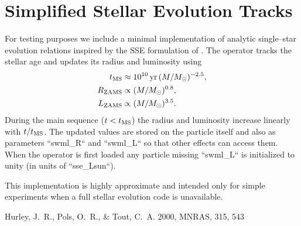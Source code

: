\section{Simplified Stellar Evolution Tracks}
\label{sec:sse_tracks}

For testing purposes we include a minimal implementation of analytic
single--star evolution relations inspired by the SSE formulation of
\citet{Hurley2000}.  The operator tracks the stellar age and updates
its radius and luminosity using
\begin{align}
  t_{\rm MS} &\approx 10^{10}\,\mathrm{yr}\,(M/M_\odot)^{-2.5},\\
  R_{\rm ZAMS} &\propto (M/M_\odot)^{0.8},\\
  L_{\rm ZAMS} &\propto (M/M_\odot)^{3.5}.
\end{align}
During the main sequence ($t<t_{\rm MS}$) the radius and luminosity
increase linearly with $t/t_{\rm MS}$.  The updated values are stored
on the particle itself and also as parameters ``swml_R`` and
``swml_L`` so that other effects can access them.  When the operator
is first loaded any particle missing ``swml_L`` is initialized to
unity (in units of ``sse\_Lsun``).

This implementation is highly approximate and intended only for simple
experiments when a full stellar evolution code is unavailable.


\begin{thebibliography}{99}
 Hurley, J.~R., Pols, O.~R., \& Tout, C.~A. 2000, MNRAS, 315, 543
\end{thebibliography}

